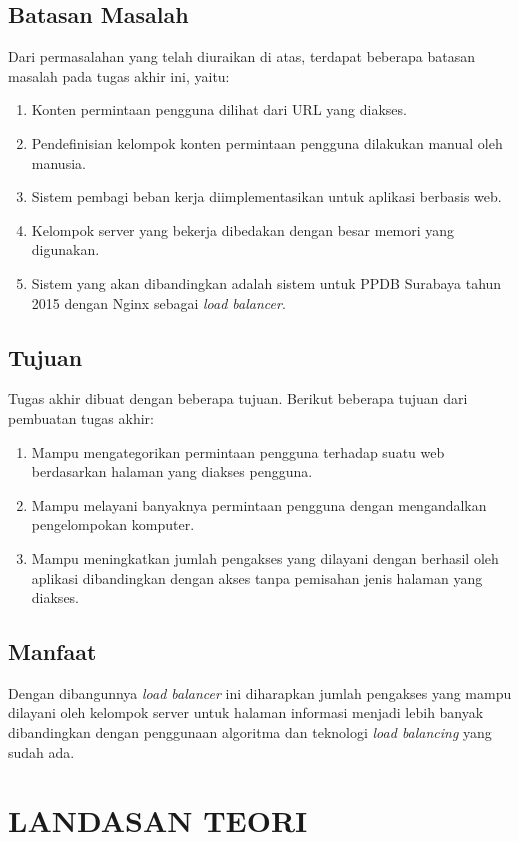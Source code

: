 \documentclass{ta-its}
\begin{document}
        \section{Batasan Masalah}
			Dari permasalahan yang telah diuraikan di atas, terdapat beberapa batasan masalah pada tugas akhir ini, yaitu:
			\begin{enumerate}
			\item Konten permintaan pengguna dilihat dari URL yang diakses.
			\item Pendefinisian kelompok konten permintaan pengguna dilakukan manual oleh manusia.
			\item Sistem pembagi beban kerja diimplementasikan untuk aplikasi berbasis web.
			\item Kelompok server yang bekerja dibedakan dengan besar memori yang digunakan.
			\item Sistem yang akan dibandingkan adalah sistem untuk PPDB Surabaya tahun 2015 dengan Nginx sebagai \textit{load balancer}.
			\end{enumerate}

        \section{Tujuan}
			Tugas akhir dibuat dengan beberapa tujuan. Berikut beberapa tujuan dari pembuatan tugas akhir:
			\begin{enumerate}
			\item Mampu mengategorikan permintaan pengguna terhadap suatu web berdasarkan halaman yang diakses pengguna.
			\item Mampu melayani banyaknya permintaan pengguna dengan mengandalkan pengelompokan komputer.
			\item Mampu meningkatkan jumlah pengakses yang dilayani dengan berhasil oleh aplikasi dibandingkan dengan akses tanpa pemisahan jenis halaman yang diakses.
			\end{enumerate}

        \section{Manfaat}
			Dengan dibangunnya \emph{load balancer} ini diharapkan jumlah pengakses yang mampu dilayani oleh kelompok server untuk halaman informasi menjadi lebih banyak dibandingkan dengan penggunaan algoritma dan teknologi \emph{load balancing} yang sudah ada.

   \chapter{LANDASAN TEORI}
\end{document}
